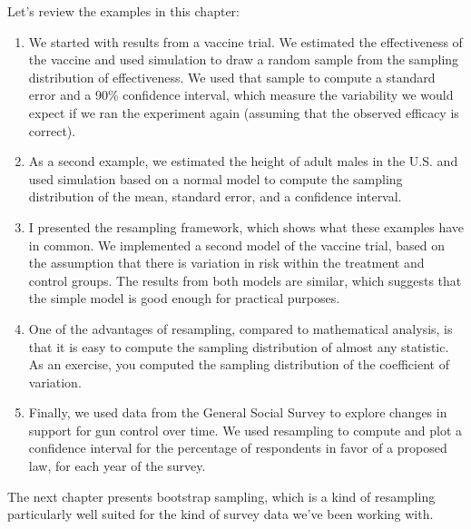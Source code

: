 Let's review the examples in this chapter:

\begin{enumerate}
\def\labelenumi{\arabic{enumi}.}
\item
  We started with results from a vaccine trial. We estimated the
  effectiveness of the vaccine and used simulation to draw a random
  sample from the sampling distribution of effectiveness. We used that
  sample to compute a standard error and a 90\% confidence interval,
  which measure the variability we would expect if we ran the experiment
  again (assuming that the observed efficacy is correct).
\item
  As a second example, we estimated the height of adult males in the
  U.S. and used simulation based on a normal model to compute the
  sampling distribution of the mean, standard error, and a confidence
  interval.
\item
  I presented the resampling framework, which shows what these examples
  have in common. We implemented a second model of the vaccine trial,
  based on the assumption that there is variation in risk within the
  treatment and control groups. The results from both models are
  similar, which suggests that the simple model is good enough for
  practical purposes.
\item
  One of the advantages of resampling, compared to mathematical
  analysis, is that it is easy to compute the sampling distribution of
  almost any statistic. As an exercise, you computed the sampling
  distribution of the coefficient of variation.
\item
  Finally, we used data from the General Social Survey to explore
  changes in support for gun control over time. We used resampling to
  compute and plot a confidence interval for the percentage of
  respondents in favor of a proposed law, for each year of the survey.
\end{enumerate}

The next chapter presents bootstrap sampling, which is a kind of
resampling particularly well suited for the kind of survey data we've
been working with.

